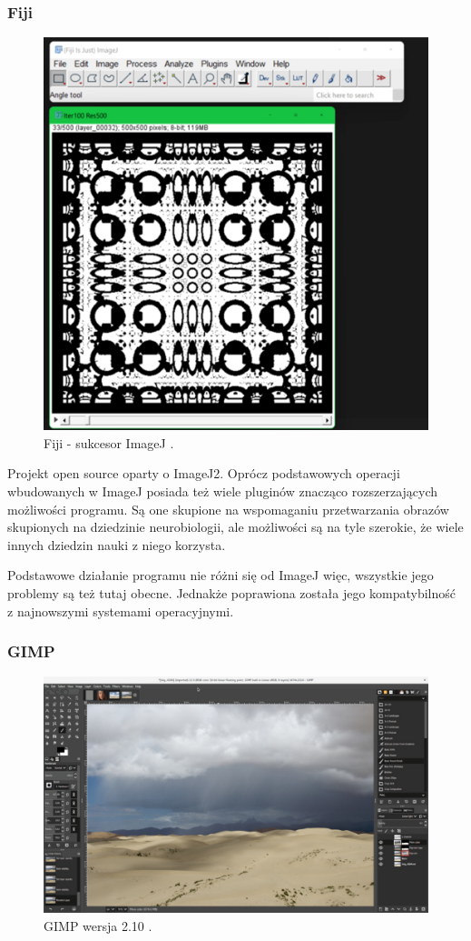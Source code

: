 \subsubsection{Fiji}
\begin{figure}[H]
    \centering
    \includegraphics[width=0.8\linewidth]{./images/Picture4.jpg}
    \caption{Fiji - sukcesor ImageJ \cite{fiji}.}
    \label{fig:fiji}
\end{figure}

Projekt open source oparty o ImageJ2. Oprócz podstawowych operacji wbudowanych w ImageJ posiada też wiele pluginów znacząco rozszerzających możliwości programu. 
Są one skupione na wspomaganiu przetwarzania obrazów skupionych na dziedzinie neurobiologii, ale możliwości są na tyle szerokie, że wiele innych dziedzin nauki z niego korzysta.

Podstawowe działanie programu nie różni się od ImageJ więc, wszystkie jego problemy są też tutaj obecne. Jednakże poprawiona została jego kompatybilność z najnowszymi systemami operacyjnymi.

\subsubsection{GIMP}
\begin{figure}[H]
    \centering
    \includegraphics{./images/Picture5.jpg}
    \caption{GIMP wersja 2.10 \cite{gimp}.}
    \label{fig:gimp}
\end{figure}

